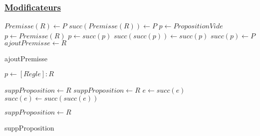 \documentclass{article}
\begin{document}
\subsubsection{\underline{Modificateurs}}
\begin{algorithm}
    \SetAlgoLined 
    
    \begin{algorithmic}
    
                \STATE $Premisse(R) \gets P$ 
            \ELSE 
                    \STATE $succ(Premisse(R)) \gets P$
                \ELSE
                    \STATE $p \gets PropositionVide$
                    \STATE $p \gets Premisse(R)$ 
                        \STATE $p \gets succ(p)$
                    \ENDWHILE
                    \STATE $succ(succ(p)) \gets succ(p)$ 
                    \STATE $succ(p) \gets P$
                \ENDIF
            \ENDIF
         \ENDIF
         \STATE $ajoutPremisse \gets R$
    \end{algorithmic}
    \caption{ajoutPremisse}
\end{algorithm}
\clearpage
\begin{algorithm}
    \SetAlgoLined
    \KwResult{[Règle]}
    
    \begin{algorithmic}
    
        \STATE $p \gets [R\grave{e}gle] : R$
        
            \STATE $suppProposition \gets R$
        \ELSE
                \STATE $suppProposition \gets R$
            \ELSE
                    \STATE $e \gets succ(e)$
                \ENDWHILE
                \STATE $succ(e) \gets succ(succ(e))$
                
                \STATE $suppProposition \gets R$
            \ENDIF
        \ENDIF
    
    \end{algorithmic}
    \caption{suppProposition} 
\end{algorithm}
\end{document}
